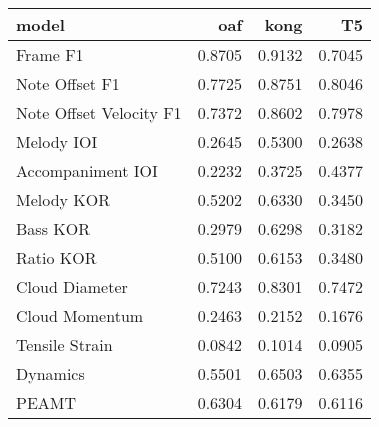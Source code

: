 \begin{tabular}{lrrr}
\toprule
model & oaf & kong & T5 \\
\midrule
Frame F1 & 0.8705 & 0.9132 & 0.7045 \\
Note Offset F1 & 0.7725 & 0.8751 & 0.8046 \\
Note Offset Velocity F1 & 0.7372 & 0.8602 & 0.7978 \\
Melody IOI & 0.2645 & 0.5300 & 0.2638 \\
Accompaniment IOI & 0.2232 & 0.3725 & 0.4377 \\
Melody KOR & 0.5202 & 0.6330 & 0.3450 \\
Bass KOR & 0.2979 & 0.6298 & 0.3182 \\
Ratio KOR & 0.5100 & 0.6153 & 0.3480 \\
Cloud Diameter & 0.7243 & 0.8301 & 0.7472 \\
Cloud Momentum & 0.2463 & 0.2152 & 0.1676 \\
Tensile Strain & 0.0842 & 0.1014 & 0.0905 \\
Dynamics & 0.5501 & 0.6503 & 0.6355 \\
PEAMT & 0.6304 & 0.6179 & 0.6116 \\
\bottomrule
\end{tabular}
